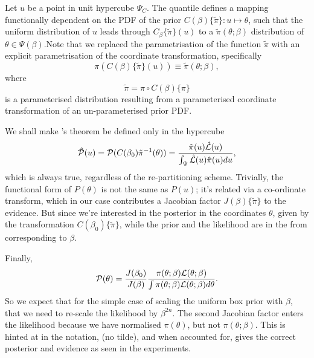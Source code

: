 \documentclass[usenatbib]{mnras}
\begin{document}
Let \(u\) be a point in unit hypercube \(\Psi_{C}\). The quantile
defines a mapping functionally dependent on the PDF of the prior
\(C(\beta)\lbrace \tilde{\pi}\rbrace:u \mapsto \theta\), such that
the uniform distribution of \(u\) leads through
\(C_{\beta}\{\tilde{\pi}\}(u)\) to a \(\tilde{\pi}(\theta;\beta)\)
distribution of \(\theta \in\Psi(\beta)\).Note that we replaced the
parametrisation of the function \(\tilde{\pi}\) with an explicit
parametrisation of the coordinate transformation, specifically
\begin{equation}
  \pi(C(\beta)\{\tilde{\pi}\}(u)) \equiv \tilde{\pi}(\theta; \beta),
\end{equation}
where 
\begin{equation}
  \tilde{\pi} =  \pi \circ C(\beta) \{ \pi \} 
\end{equation}
is a parameterised distribution resulting from a parameterised
coordinate transformation of an un-parameterised prior PDF.

We shall make \citeauthor{1763} 's theorem be defined only in the
hypercube
\begin{equation}
{\cal \hat{P}}(u) = {\cal P}(C(\beta_{0}){\tilde{\pi}}^{-1}(\theta)) = \frac{\hat{\pi} (u) {\cal \hat{L}}(u)}{\int_{\Psi}{\cal \hat{L}}(u) \hat{\pi}(u) du},
\end{equation}
which is always true, regardless of the re-partitioning
scheme. Trivially, the functional form of \(P(\theta)\) is not the same
as \(P(u)\); it's related via a co-ordinate transform, which in our
case contributes a Jacobian factor \(J(\beta)\{\tilde{\pi}\}\) to the
evidence. But since we're interested in the posterior in the
coordinates \(\theta\), given by the transformation \(C(\beta_{0})\{\tilde{\pi}\}\),
while the prior and the likelihood are in the from corresponding
to \(\beta\).

Finally, 
\begin{equation}
 {\cal P}(\theta) = \frac{J(\beta_{0})}{J(\beta)} \frac{\pi(\theta; \beta) {\cal L}(\theta; \beta)}{\int \pi(\theta; \beta) {\cal L}(\theta; \beta) d \theta}.
\end{equation}
So we expect that for the simple case of scaling the uniform box
prior with \(\beta\), that we need to re-scale the likelihood by
\(\beta^{2n}\). The second Jacobian factor enters the likelihood because
we have normalised \(\pi(\theta)\), but not \(\pi(\theta; \beta)\). This is hinted at in
the notation, (no tilde), and when accounted for, gives  the correct
posterior and evidence as seen in the experiments. 
\end{document}

